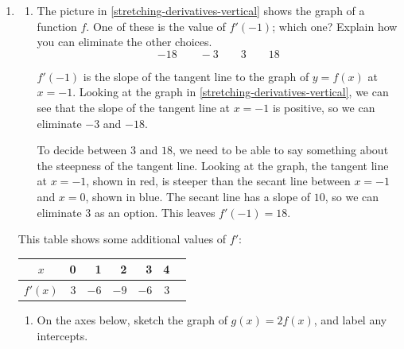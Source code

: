 \documentclass{article}
\begin{document}

\begin{enumerate}
\item  \label{stretching-derivatives}

  \begin{enumerate}
  \item


    \begin{problem}[\vfill]
      The picture in \ref{stretching-derivatives-vertical} shows the graph of a function $f$. One of these is the value of $f'(-1)$; which one? Explain how you can eliminate the other choices.
      \[ -18 \qquad -3 \qquad 3 \qquad 18 \]
    \end{problem}

    \begin{solution}
      $f'(-1)$ is the slope of the tangent line to the graph of $y=f(x)$ at $x=-1$.
      Looking at the graph in \ref{stretching-derivatives-vertical}, we can see
      that the slope of the tangent line at $x=-1$ is positive, so we can eliminate
      $-3$ and $-18$. 

      
      To decide between $3$ and $18$, we need to be able to say something about
      the steepness of the tangent line. Looking at the graph, the tangent line at $x=-1$, shown in red, is steeper than the secant
      line between $x=-1$ and $x=0$, shown in blue. 
      The secant line has a slope of $10$, so
      we can eliminate $3$ as an option. This leaves $f'(-1)=18$.
    \end{solution}

  \end{enumerate}
  This table shows some additional values of $f'$:
  \begin{center}
    \begin{tabular}{c | r r r r r r}
      $x$ & 0 & 1 & 2 & 3 & 4 \\
      \hline
      $f'(x)$ & $3$ & $-6$ & $-9$ & $-6$ & $3$
    \end{tabular}
  \end{center}
  \begin{enumerate}[resume, topsep=0pt]
  \item \label{stretching-derivatives-vertical}
    \begin{problem}
      On the axes below, sketch the graph of $g(x) = 2 f(x)$, and label any intercepts.


\end{problem}
\end{enumerate}
\end{enumerate}
\end{document}
